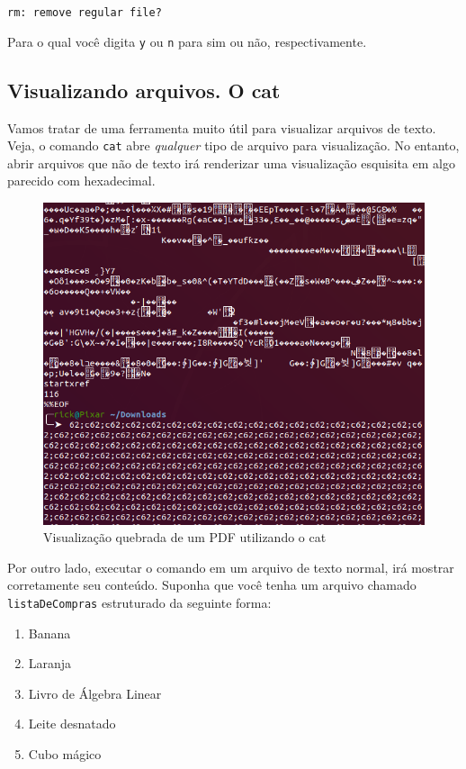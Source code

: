 \documentclass{article}
\begin{document}
	\vspace{1ex}
	\texttt{rm: remove regular file?} 
	\vspace{1ex} 
	
	Para o qual você digita \texttt{y} ou \texttt{n} para sim ou não, respectivamente. 

	\subsection{Visualizando arquivos. O cat} 

	Vamos tratar de uma ferramenta muito útil para visualizar arquivos de texto. Veja, o comando \texttt{cat} abre 
	\textit{qualquer} tipo de arquivo para visualização. No entanto, abrir arquivos que não de texto irá renderizar 
	uma visualização esquisita em algo parecido com hexadecimal.

	\begin{figure}[ht!]
  		\centering
		\includegraphics[scale=0.3]{figs/brokenCat.png} 
  		\caption*{Visualização quebrada de um PDF utilizando o cat}
	\end{figure}


	Por outro lado, executar o comando em um arquivo de texto normal, irá mostrar corretamente seu conteúdo. 
	Suponha que você tenha um arquivo chamado \texttt{listaDeCompras} estruturado da seguinte forma:

	\begin{enumerate}
		\item{Banana}
		\item{Laranja} 
		\item{Livro de Álgebra Linear} 
		\item{Leite desnatado} 
		\item{Cubo mágico} 
	\end{enumerate} 
\end{document}

